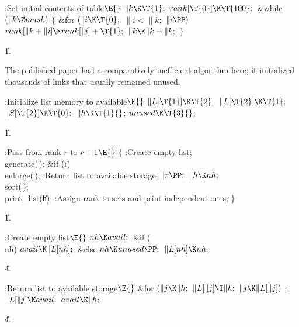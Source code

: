 \B{}:Set initial contents of  table\X${}\E{}$%
\6
$\|k\K\T{1};{}$\6
${}\\{rank}[\T{0}]\K\T{100};{}$\6
\&{while} ${}(\|k\Z\\{mask}){}$\5
${}\{{}$\1\6
\&{for} ${}(\|i\K\T{0};{}$ ${}\|i<\|k;{}$ ${}\|i\PP){}$\1\5
${}\\{rank}[\|k+\|i]\K\\{rank}[\|i]+\T{1};{}$\2\6
${}\|k\K\|k+\|k;{}$\6
\4${}\}{}$\2\par
\U1.\fi

The published paper had a comparatively inefficient
algorithm here;
it initialized thousands of links that usually remained unused.

\Y\B\4:Initialize list memory to available\X${}\E{}$\6
$\|L[\T{1}]\K\T{2};{}$\6
${}\|L[\T{2}]\K\T{1};{}$\6
${}\|S[\T{2}]\K\T{0};{}$\6
${}\|h\K\T{1}{}$;\6
${}\\{unused}\K\T{3}{}$;\par
\U1.\fi

\B{}:Pass from rank $r$ to $r+1$\X${}\E{}$\6
${}\{{}$\1\6
:Create empty list\X;\6
\\{generate}(\,);\6
\&{if} (\|r)\1\5
\\{enlarge}(\,);\2\6
:Return list  to available storage\X;\6
${}\|r\PP;{}$\6
${}\|h\K\\{nh};{}$\6
\\{sort}(\,);\6
\\{print\_list}(\|h);\6
:Assign rank to sets and print independent ones\X;\6
\4${}\}{}$\2\par
\U1.\fi

\B{}:Create empty list\X${}\E{}$\6
$\\{nh}\K\\{avail};{}$\6
\&{if} (\\{nh})\1\5
${}\\{avail}\K\|L[\\{nh}];{}$\2\6
\&{else}\1\5
${}\\{nh}\K\\{unused}\PP;{}$\2\6
${}\|L[\\{nh}]\K\\{nh}{}$;\par
\U4.\fi

\B{}:Return list  to available storage\X${}\E{}$\6
\&{for} ${}(\|j\K\|h;{}$ ${}\|L[\|j]\I\|h;{}$ ${}\|j\K\|L[\|j]){}$\1\5
;\2\6
${}\|L[\|j]\K\\{avail};{}$\6
${}\\{avail}\K\|h{}$;\par
\U4.\fi

